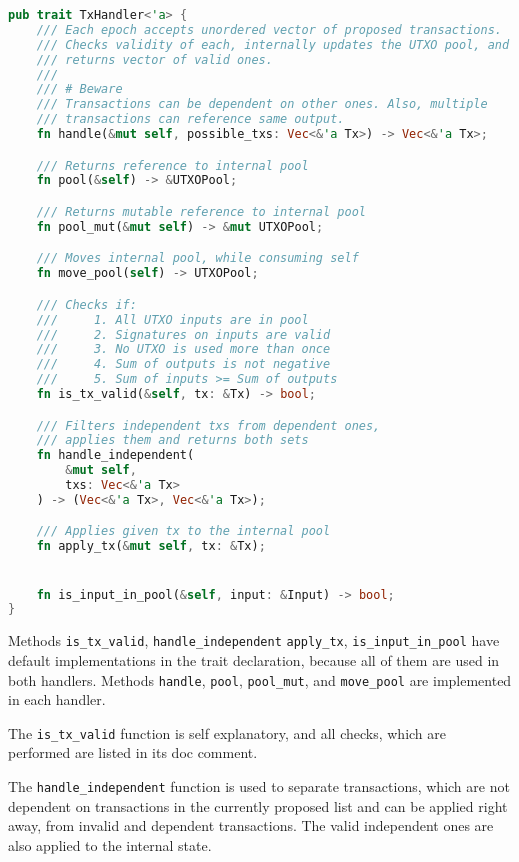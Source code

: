 \pagebreak
\begin{lstlisting}[language=Rust, style=boxed, caption={TxHandler}]
pub trait TxHandler<'a> {
    /// Each epoch accepts unordered vector of proposed transactions.
    /// Checks validity of each, internally updates the UTXO pool, and
    /// returns vector of valid ones.
    ///
    /// # Beware
    /// Transactions can be dependent on other ones. Also, multiple
    /// transactions can reference same output.
    fn handle(&mut self, possible_txs: Vec<&'a Tx>) -> Vec<&'a Tx>;

    /// Returns reference to internal pool
    fn pool(&self) -> &UTXOPool;

    /// Returns mutable reference to internal pool
    fn pool_mut(&mut self) -> &mut UTXOPool;

    /// Moves internal pool, while consuming self
    fn move_pool(self) -> UTXOPool;

    /// Checks if:
    ///     1. All UTXO inputs are in pool
    ///     2. Signatures on inputs are valid
    ///     3. No UTXO is used more than once
    ///     4. Sum of outputs is not negative
    ///     5. Sum of inputs >= Sum of outputs
    fn is_tx_valid(&self, tx: &Tx) -> bool;

    /// Filters independent txs from dependent ones,
    /// applies them and returns both sets
    fn handle_independent(
        &mut self,
        txs: Vec<&'a Tx>
    ) -> (Vec<&'a Tx>, Vec<&'a Tx>);

    /// Applies given tx to the internal pool
    fn apply_tx(&mut self, tx: &Tx);


    fn is_input_in_pool(&self, input: &Input) -> bool;
}
\end{lstlisting}

Methods \texttt{is\_tx\_valid}, \texttt{handle\_independent}
\texttt{apply\_tx}, \texttt{is\_input\_in\_pool} have
default implementations in the trait declaration, because all of them are used
in both handlers. Methods \texttt{handle}, \texttt{pool}, \texttt{pool\_mut},
and \texttt{move\_pool} are implemented in each handler.

The \texttt{is\_tx\_valid} function is self explanatory, and all checks, which
are performed are listed in its doc comment.

The \texttt{handle\_independent} function is used to separate transactions,
which are not dependent on transactions in the currently proposed list and can be
applied right away, from invalid and dependent transactions. The valid independent
ones are also applied to the internal state.

